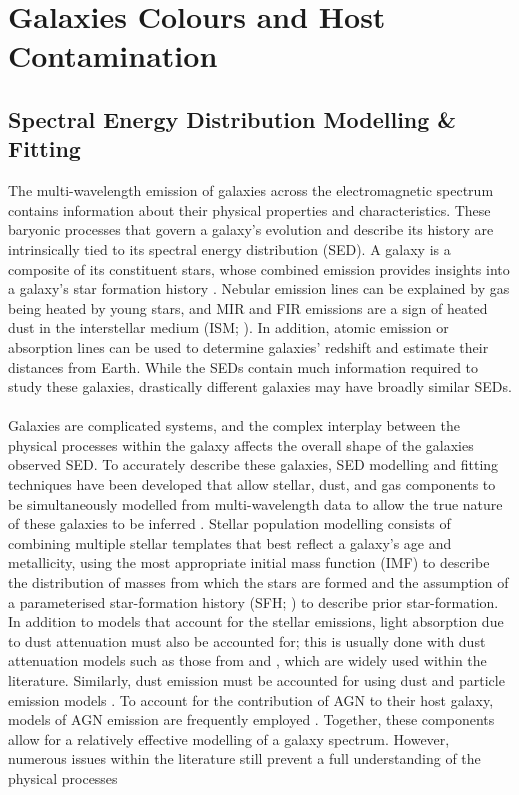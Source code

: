 \section{Galaxies Colours and Host Contamination}
\subsection{Spectral Energy Distribution Modelling \& Fitting}
The multi-wavelength emission of galaxies across the electromagnetic spectrum contains information about their physical properties and characteristics. These baryonic processes that govern a galaxy's evolution and describe its history are intrinsically tied to its spectral energy distribution (SED). A galaxy is a composite of its constituent stars, whose combined emission provides insights into a galaxy's star formation history \citep{tinsley_evolution_1980}. Nebular emission lines can be explained by gas being heated by young stars, and MIR and FIR emissions are a sign of heated dust in the interstellar medium (ISM; \citealt{da_cunha_simple_2008}). In addition, atomic emission or absorption lines can be used to determine galaxies' redshift and estimate their distances from Earth. While the SEDs contain much information required to study these galaxies, drastically different galaxies may have broadly similar SEDs. \\\\ Galaxies are complicated systems, and the complex interplay between the physical processes within the galaxy affects the overall shape of the galaxies observed SED. To accurately describe these galaxies, SED modelling and fitting techniques have been developed that allow stellar, dust, and gas components to be simultaneously modelled from multi-wavelength data to allow the true nature of these galaxies to be inferred \citep{walcher_fitting_2011, conroy_modeling_2013}. Stellar population modelling consists of combining multiple stellar templates \citep{bruzual_stellar_2003, eldridge_spectral_2009} that best reflect a galaxy's age and metallicity, using the most appropriate initial mass function (IMF) to describe the distribution of masses from which the stars are formed \citep{salpeter_luminosity_1955, chabrier_galactic_2003} and the assumption of a parameterised star-formation history (SFH; \citealt{carnall_how_2019}) to describe prior star-formation. In addition to models that account for the stellar emissions, light absorption due to dust attenuation must also be accounted for; this is usually done with dust attenuation models such as those from \cite{charlot_simple_2000} and \cite{calzetti_dust_2000}, which are widely used within the literature. Similarly, dust emission must be accounted for using dust and particle emission models \citep{draine_infrared_2007, dale_two-parameter_2014}. To account for the contribution of AGN to their host galaxy, models of AGN emission are frequently employed \citep{fritz_revisiting_2006, stalevski_dust_2016}. Together, these components allow for a relatively effective modelling of a galaxy spectrum. However, numerous issues within the literature still prevent a full understanding of the physical processes 